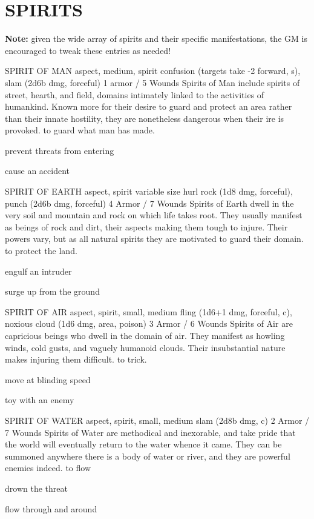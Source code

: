 \documentclass[oneside,10pt]{article}
\begin{document}
\section{SPIRITS}
\begin{multicols}{2}
\textbf{Note:} given the wide array of spirits and their specific manifestations, the GM is encouraged to tweak these entries as
needed!

\critterspec
{SPIRIT OF MAN	}
{aspect, medium, spirit}
{confusion (targets take -2 forward, s), slam (2d6b dmg, forceful)}
{1 armor / 5 Wounds}
{Spirits of Man include spirits of street, hearth, and field, domains intimately linked to the activities of humankind. Known more for their desire to guard and protect an area rather than their innate hostility, they are nonetheless dangerous when their ire is provoked.}
{to guard what man has made.}
{\tcirc{} prevent threats from entering

\tcirc{} cause an accident}

\critterspec
{SPIRIT OF EARTH	}
{aspect, spirit variable size}
{hurl rock (1d8 dmg, forceful), punch (2d6b dmg, forceful)}
{4 Armor / 7 Wounds}
{Spirits of Earth dwell in the very soil and mountain and rock on which life takes root. They usually manifest as beings of rock and dirt, their aspects making them tough to injure. Their powers vary, but as all natural spirits they are motivated to guard their domain.}
{to protect the land.}
{\tcirc{} engulf an intruder

\tcirc{} surge up from the ground}

\critterspec
{SPIRIT OF AIR	}
{aspect, spirit, small, medium}
{fling (1d6+1 dmg, forceful, c), noxious cloud (1d6 dmg, area, poison)}
{3 Armor / 6 Wounds}
{Spirits of Air are capricious beings who dwell in the domain of air. They manifest as howling winds, cold gusts, and vaguely humanoid clouds. Their insubstantial nature makes injuring them difficult.}
{to trick.}
{\tcirc{} move at blinding speed

\tcirc{} toy with an enemy}

\critterspec
{SPIRIT OF WATER	}
{aspect, spirit, small, medium}
{slam (2d8b dmg, c)}
{2 Armor / 7 Wounds}
{Spirits of Water are methodical and inexorable, and take pride that the world will eventually return to the water whence it came. They can be summoned anywhere there is a body of water or river, and they are powerful enemies indeed.}
{to flow}
{\tcirc{} drown the threat

\tcirc{} flow through and around}


\end{multicols}
\end{document}
